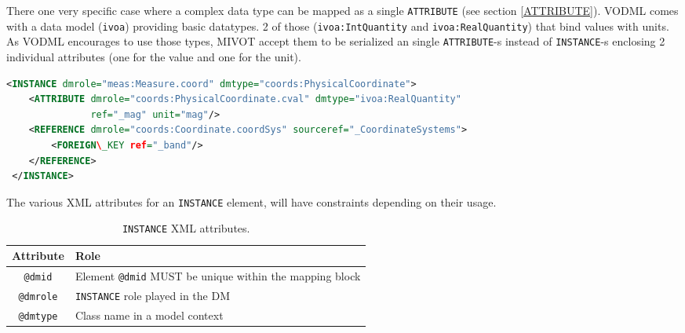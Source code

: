 There one very specific case where a complex data type can be mapped as a single \texttt{ATTRIBUTE} (see section \ref{ATTRIBUTE}). 
VODML comes with a data model (\texttt{ivoa}) providing basic datatypes. 2 of those (\texttt{ivoa:IntQuantity} 
and \texttt{ivoa:RealQuantity}) that bind values with units. 
As VODML encourages to use those types, MIVOT accept them to be serialized an single \texttt{ATTRIBUTE}-s
instead of \texttt{INSTANCE}-s enclosing 2 individual attributes (one for the value and one for the unit).

\begin{lstlisting}[caption={Example of complex data type (\texttt{ivoa:RealQuantity}) serialized 
as a single \texttt{ATTRIBUTE}  (see line~\ref{IVOA_snippet} in Appendix~\ref{appendix_A}).
The  attribute of type \texttt{ivoa:RealQuantity} is a shortcut for an 
texttt{INSTANCE[@dmtype=ivoa:RealQuantity]} which has 2 attributes (value and unit)
},language=XML]
<INSTANCE dmrole="meas:Measure.coord" dmtype="coords:PhysicalCoordinate">
    <ATTRIBUTE dmrole="coords:PhysicalCoordinate.cval" dmtype="ivoa:RealQuantity" 
               ref="_mag" unit="mag"/>
    <REFERENCE dmrole="coords:Coordinate.coordSys" sourceref="_CoordinateSystems">
        <FOREIGN\_KEY ref="_band"/>
    </REFERENCE>
 </INSTANCE>
\end{lstlisting}   



The various XML attributes for an \texttt{INSTANCE} element, will have constraints depending on their usage.
\begin{table}[!htbp]
\small
\centering
\begin{tabulary}{\linewidth}{|c|J|}       
       \hline 
            \textbf{Attribute} & 
            \textbf {Role}\\
       \hline         \hline  
            \texttt{@dmid} & 
            Element  \texttt{@dmid}  MUST be unique within the mapping block  \\
        \hline 
            \texttt{@dmrole} & 
            \texttt{INSTANCE} role played in the DM \\
        \hline 
            \texttt{@dmtype} & 
            Class name in a model context\\
        \hline 
     \end{tabulary}
     \caption{\texttt{INSTANCE} XML attributes.} 
     \label{tbl:instance-att}
 \end{table}   
 


